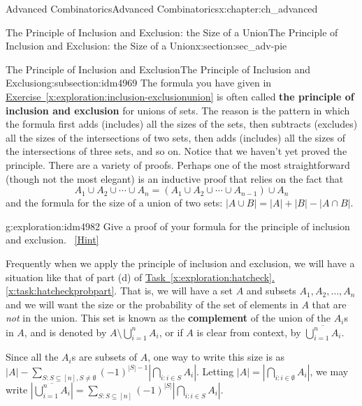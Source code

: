 \documentclass[oneside,10pt,]{book}
\newcommand{\terminology}[1]{\textbf{#1}}
\numberwithin{equation}{chapter}
\newcommand{\card}[1]{\left| #1 \right|}
\begin{document}
\begin{chapterptx}{Advanced Combinatorics}{}{Advanced Combinatorics}{}{}{x:chapter:ch_advanced}
\begin{sectionptx}{The Principle of Inclusion and Exclusion: the Size of a Union}{}{The Principle of Inclusion and Exclusion: the Size of a Union}{}{}{x:section:sec_adv-pie}
\begin{subsectionptx}{The Principle of Inclusion and Exclusion}{}{The Principle of Inclusion and Exclusion}{}{}{g:subsection:idm4969}
The formula you have given in \hyperref[x:exploration:inclusion-exclusionunion]{Exercise~\ref{x:exploration:inclusion-exclusionunion}} is often called \terminology{the principle of inclusion and exclusion} for unions of sets. The reason is the pattern in which the formula first adds (includes) all the sizes of the sets, then subtracts (excludes) all the sizes of the intersections of two sets, then adds (includes) all the sizes of the intersections of three sets, and so on.   Notice that we haven't yet proved the principle. There are a variety of proofs.  Perhaps one of the most straightforward (though not the most elegant) is an inductive proof that relies on the fact that%
\begin{equation*}
A_1 \cup A_2 \cup \cdots \cup A_n = \left(A_1 \cup A_2 \cup \cdots \cup A_{n-1}\right) \cup A_n
\end{equation*}
and the formula for the size of a union of two sets: \(\card{A \cup B} = \card{A} + \card{B} - \card{A\cap B}\).%
\begin{exploration}{}{g:exploration:idm4982}%
Give a proof of your formula for the principle of inclusion and exclusion.%
\qquad~\hfill{\tiny\hyperlink{g:hint:idm4985-back}{[Hint]}}\end{exploration}
Frequently when we apply the principle of inclusion and exclusion, we will have a situation like that of part (d) of \hyperref[x:task:hatcheckprobpart]{Task~\ref{x:exploration:hatcheck}.\ref{x:task:hatcheckprobpart}}.  That is, we will have a set \(A\) and subsets \(A_1, A_2, \ldots, A_n\) and we will want the size or the probability of the set of elements in \(A\) that are \emph{not} in the union.  This set is known as the \terminology{complement}  of the union of the \(A_i\)s in \(A\), and is denoted by \(A \setminus \bigcup_{i=1}^n A_i\), or if \(A\) is clear from context, by \(\overline{\bigcup_{i=1}^n A_i}\).%
\par
Since all the \(A_i\)s are subsets of \(A\), one way to write this size is as \(|A| - \sum_{S:S \subseteq [n], S \ne \emptyset}(-1)^{|S|-1} |\bigcap_{i:i \in S}A_i|\).  Letting \(|A| = \left|\bigcap_{i:i \in \emptyset} A_i\right|\), we may write \(\left|\overline{\bigcup_{i=1}^n A_i}\right| = \sum_{S:S \subseteq [n]} (-1)^{|S|}\left| \bigcap_{i:i\in S} A_i\right|\).%
\par

\end{subsectionptx}
\end{sectionptx}
\end{chapterptx}
\end{document}
